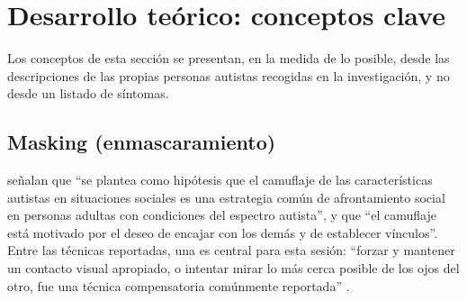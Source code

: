 
\section{Desarrollo teórico: conceptos clave}

Los conceptos de esta sección se presentan, en la medida de lo posible, desde las descripciones de las propias personas autistas recogidas en la investigación, y no desde un listado de síntomas.

\subsection{Masking (enmascaramiento)}

\citet[p.~2519]{hull2017} señalan que \enquote{se plantea como hipótesis que el camuflaje de las características autistas en situaciones sociales es una estrategia común de afrontamiento social en personas adultas con condiciones del espectro autista}, y que \enquote{el camuflaje está motivado por el deseo de encajar con los demás y de establecer vínculos}.
Entre las técnicas reportadas, una es central para esta sesión: \enquote{forzar y mantener un contacto visual apropiado, o intentar mirar lo más cerca posible de los ojos del otro, fue una técnica compensatoria comúnmente reportada} \citep{hull2017}.


